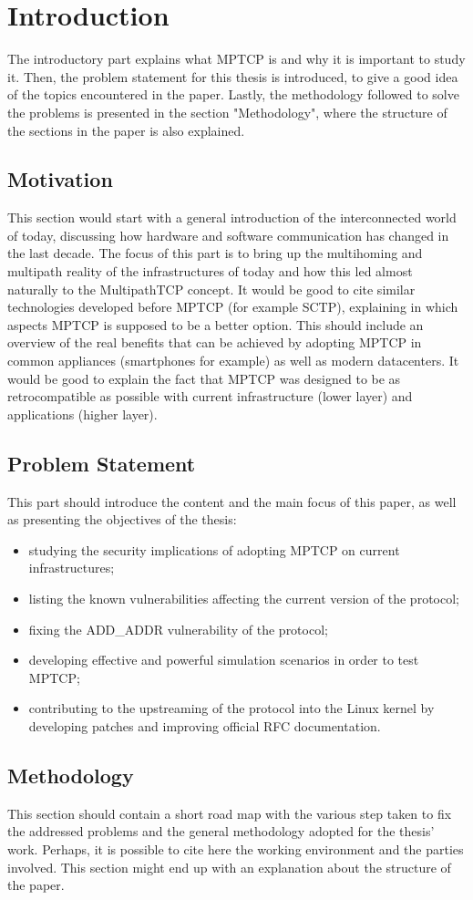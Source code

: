 \chapter{Introduction}
\label{chap:introduction}

The introductory part explains what MPTCP is and why it is important to study it. Then, the problem statement for this thesis is introduced, to give a good idea of the topics encountered in the paper. Lastly, the methodology followed to solve the problems is presented in the section "Methodology", where the structure of the sections in the paper is also explained.

\section{Motivation}
This section would start with a general introduction of the interconnected world of today, discussing how hardware and software communication has changed in the last decade. The focus of this part is to bring up the multihoming and multipath reality of the infrastructures of today and how this led almost naturally to the MultipathTCP concept. It would be good to cite similar technologies developed before MPTCP (for example SCTP), explaining in which aspects MPTCP is supposed to be a better option.
This should include an overview of the real benefits that can be achieved by adopting MPTCP in common appliances (smartphones for example) as well as modern datacenters. It would be good to explain the fact that MPTCP was designed to be as retrocompatible as possible with current infrastructure (lower layer) and applications (higher layer).

\section{Problem Statement}
This part should introduce the content and the main focus of this paper, as well as presenting the objectives of the thesis:
\begin{itemize}
    \item studying the security implications of adopting MPTCP on current infrastructures; 
    \item listing the known vulnerabilities affecting the current version of the protocol; 
    \item fixing the ADD\_ADDR vulnerability of the protocol; 
    \item developing effective and powerful simulation scenarios in order to test MPTCP;
    \item contributing to the upstreaming of the protocol into the Linux kernel by developing patches and improving official RFC documentation.
\end{itemize}

\section{Methodology}
This section should contain a short road map with the various step taken to fix the addressed problems and the general methodology adopted for the thesis' work.
Perhaps, it is possible to cite here the working environment and the parties involved. 
This section might end up with an explanation about the structure of the paper.

